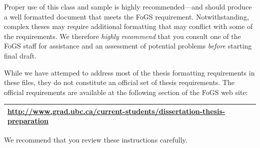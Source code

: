 \documentclass[msc,oneside]{ubcthesis}
\theoremstyle{definition}
\begin{document}
Proper use of this class and sample is highly recommended---and should
produce a well formatted document that meets the FoGS requirement.
Notwithstanding, complex theses may require additional formatting that
may conflict with some of the requirements.  We therefore \emph{highly
  recommend} that you consult one of the FoGS staff for assistance and
an assessment of potential problems \emph{before} starting final
draft.

While we have attemped to address most of the thesis formatting
requirements in these files, they do not constitute an official set of
thesis requirements.  The official requirements are available at the
following section of the FoGS web site:
\begin{center}
  \begin{tabular}{|l|}
    \hline
    \url{http://www.grad.ubc.ca/current-students/dissertation-thesis-preparation}\\
    \hline
  \end{tabular}
\end{center}
We recommend that you review these instructions carefully.
\end{document}
